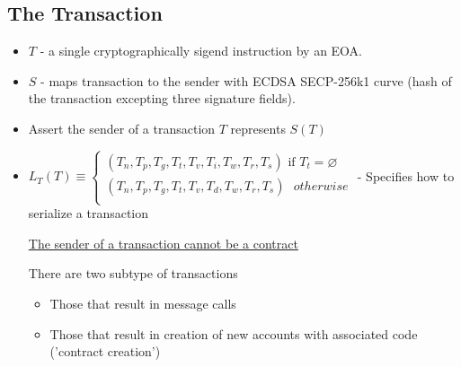 \documentclass{article}
\begin{document}
\subsection{The Transaction}
\begin{itemize}
    \item $T$ - a single cryptographically sigend instruction by an EOA. 
    \item $S$ - maps transaction to the sender with ECDSA SECP-256k1 curve (hash of the transaction excepting three signature fields). 
    \item Assert the sender of a transaction $T$ represents $S(T)$
    \item $L_T(T) \equiv \left\{
            \begin{array}{ll}
                      (T_n, T_p, T_g, T_t, T_v, T_i, T_w, T_r, T_s) \text{ if } T_t = \varnothing \\
                      (T_n, T_p, T_g, T_t, T_v, T_d, T_w, T_r, T_s) \text{ } otherwise \\
                    \end{array}
                  \right.$ - Specifies how to serialize a transaction
    
    \underline{The sender of a transaction cannot be a contract}

    There are two subtype of transactions
    \begin{itemize}
        \item Those that result in message calls
        \item Those that result in creation of new accounts with associated code ('contract creation')
    \end{itemize} 
    

\end{itemize}
\end{document}
